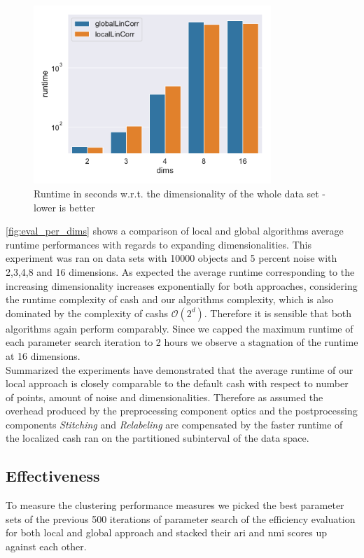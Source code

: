 \begin{figure}[h]
    \centering
        \includegraphics[width=0.8\textwidth]{evaluation/per_dims/Avg_Runtime_O10000_N5_pdims_log.pdf}
    \caption{Runtime in seconds w.r.t. the dimensionality of the whole data set - lower is better}
    \label{fig:eval_per_dims}
\end{figure}

\autoref{fig:eval_per_dims} shows a comparison of local and global algorithms average runtime performances with regards to expanding dimensionalities. This experiment was ran on data sets with 10000 objects and 5 percent noise with 2,3,4,8 and 16 dimensions. As expected the average runtime corresponding to the increasing dimensionality increases exponentially for both approaches, considering the runtime complexity of \gls{cash} and our algorithms complexity, which is also dominated by the complexity of \gls{cash}s $\mathcal{O}(2^d)$. Therefore it is sensible that both algorithms again perform comparably.
Since we capped the maximum runtime of each parameter search iteration to 2 hours we observe a stagnation of the runtime at 16 dimensions.\\

Summarized the experiments have demonstrated that the average runtime of our local approach is closely comparable to the default \gls{cash} with respect to number of points, amount of noise and dimensionalities. Therefore as assumed the overhead produced by the preprocessing component \gls{optics} and the postprocessing components \textit{Stitching} and \textit{Relabeling} are compensated by the faster runtime of the localized \gls{cash} ran on the partitioned subinterval of the data space. 
 
\subsection{Effectiveness}
To measure the clustering performance measures we picked the best parameter sets of the previous 500 iterations of parameter search of the efficiency evaluation for both local and global approach and stacked their \gls{ari} and \gls{nmi} scores up against each other. 

